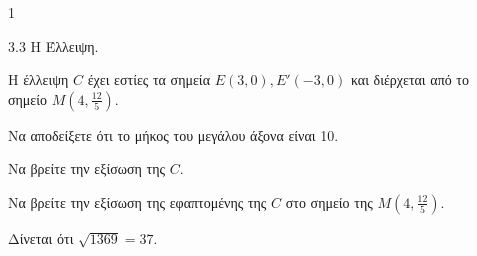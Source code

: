 \begin{ylh}{1}
    \item 3.3 Η Έλλειψη.
\end{ylh}
Η έλλειψη $C$ έχει εστίες τα σημεία $E(3,0), E'(-3,0)$ και διέρχεται από το σημείο $M\left(4,\frac{12}{5}\right)$.
\begin{alist}
\item Να αποδείξετε ότι το μήκος του μεγάλου άξονα είναι 10. 
\item Να βρείτε την εξίσωση της $C$. 
\item Να βρείτε την εξίσωση της εφαπτομένης της $C$ στο σημείο της $M\left(4,\frac{12}{5}\right)$. 
\end{alist}
Δίνεται ότι $\sqrt{1369} = 37$.